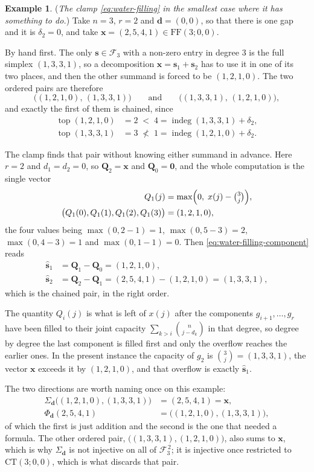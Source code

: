 \documentclass[11pt, a4paper, abstract=yes]{scrartcl}
\theoremstyle{definition}
\newtheorem{mexample}[definition]{Example}
\theoremstyle{remark}
\theoremstyle{plain}
\newcommand{\vek}[1]{\boldsymbol{#1}}
\newcommand{\indeg}{\operatorname{indeg}}
\newcommand{\tp}{\operatorname{top}}
\begin{document}
\begin{mexample}
(\emph{The clamp \eqref{eq:water-filling} in the smallest case where it has something to do.}) Take
\(n=3\), \(r=2\) and \(\vek d=(0,0)\), so that there is one gap and it is \(\delta_2=0\), and take
\(\vek x=(2,5,4,1)\in\mathrm{FF}(3;0,0)\).

By hand first. The only \(\vek s\in\mathcal F_3\) with a non-zero entry in degree \(3\) is the
full simplex \((1,3,3,1)\), so a decomposition \(\vek x=\vek s_1+\vek s_2\) has to use it in one of
its two places, and then the other summand is forced to be \((1,2,1,0)\). The two ordered pairs are
therefore
\[
  \bigl((1,2,1,0),\,(1,3,3,1)\bigr)
  \qquad\text{and}\qquad
  \bigl((1,3,3,1),\,(1,2,1,0)\bigr),
\]
and exactly the first of them is chained, since
\begin{align*}
  \tp(1,2,1,0)&=2\;<\;4=\indeg(1,3,3,1)+\delta_2 ,\\
  \tp(1,3,3,1)&=3\;\not<\;1=\indeg(1,2,1,0)+\delta_2 .
\end{align*}

The clamp finds that pair without knowing either summand in advance. Here \(r=2\)
and \(d_1=d_2=0\), so \(\vek Q_2=\vek x\) and \(\vek Q_0=\vek 0\), and the whole computation is the single
vector
\begin{align*}
  Q_1(j) &= \max\Bigl(0,\;x(j)-\tbinom 3j\Bigr),\\
  \bigl(Q_1(0),Q_1(1),Q_1(2),Q_1(3)\bigr) &= (1,2,1,0),
\end{align*}
the four values being \(\max(0,2-1)=1\), \(\max(0,5-3)=2\), \(\max(0,4-3)=1\) and
\(\max(0,1-1)=0\). Then \eqref{eq:water-filling-component} reads
\begin{align*}
  \vek{\hat s}_1 &= \vek Q_1-\vek Q_0=(1,2,1,0),\\
  \vek{\hat s}_2 &= \vek Q_2-\vek Q_1=(2,5,4,1)-(1,2,1,0)=(1,3,3,1),
\end{align*}
which is the chained pair, in the right order.

The quantity \(Q_i(j)\) is what is left of \(x(j)\) after the
components \(g_{i+1},\dots,g_r\) have been filled to their joint capacity
\(\sum_{k>i}\binom n{j-d_k}\) in that degree, so degree by degree the last component is filled
first and only the overflow reaches the earlier ones. In the present instance the capacity of
\(g_2\) is \(\binom 3j=(1,3,3,1)\), the vector \(\vek x\) exceeds it by \((1,2,1,0)\), and that
overflow is exactly \(\vek{\hat s}_1\).

The two directions are worth naming once on this example:
\begin{align*}
  \Sigma_{\vek d}\bigl((1,2,1,0),(1,3,3,1)\bigr) &= (2,5,4,1)=\vek x,\\
  \Phi_{\vek d}(2,5,4,1) &= \bigl((1,2,1,0),(1,3,3,1)\bigr),
\end{align*}
of which the first is just addition and the second is the one that needed a
formula. The other ordered pair, \(\bigl((1,3,3,1),(1,2,1,0)\bigr)\), also sums to \(\vek x\), which
is why \(\Sigma_{\vek d}\) is not injective on all of \(\mathcal F_3^{\,2}\); it is injective once
restricted to \(\mathrm{CT}(3;0,0)\), which is what discards that pair.
\label{ex-water-filling}
\end{mexample}
\end{document}
